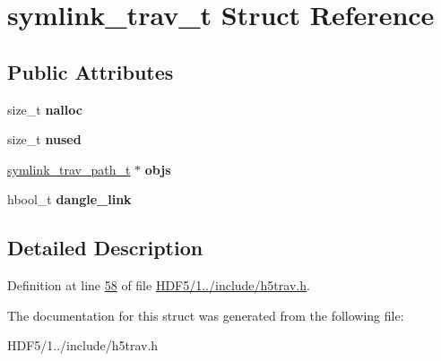 \hypertarget{structsymlink__trav__t}{}\section{symlink\+\_\+trav\+\_\+t Struct Reference}
\label{structsymlink__trav__t}
\subsection*{Public Attributes}
\begin{DoxyCompactItemize}
\item 
\mbox{\label{structsymlink__trav__t_a5982cd0a79db1f27fbc21e15b6a84c13}} 
size\+\_\+t {\bfseries nalloc}
\item 
\mbox{\label{structsymlink__trav__t_a36d98da7a456a94ed7b3a9835b9ef244}} 
size\+\_\+t {\bfseries nused}
\item 
\mbox{\label{structsymlink__trav__t_a0ac529eaa3d8259ae3a023c6a7088a95}} 
\hyperlink{structsymlink__trav__path__t}{symlink\+\_\+trav\+\_\+path\+\_\+t} $\ast$ {\bfseries objs}
\item 
\mbox{\label{structsymlink__trav__t_ab4eac7a03649216a7b6a4f6567f14a3d}} 
hbool\+\_\+t {\bfseries dangle\+\_\+link}
\end{DoxyCompactItemize}


\subsection{Detailed Description}


Definition at line \hyperlink{_h_d_f5_21_810_81_2include_2h5trav_8h_source_l00058}{58} of file \hyperlink{_h_d_f5_21_810_81_2include_2h5trav_8h_source}{H\+D\+F5/1../include/h5trav.\+h}.



The documentation for this struct was generated from the following file\+:\begin{DoxyCompactItemize}
\item 
H\+D\+F5/1../include/h5trav.\+h\end{DoxyCompactItemize}
